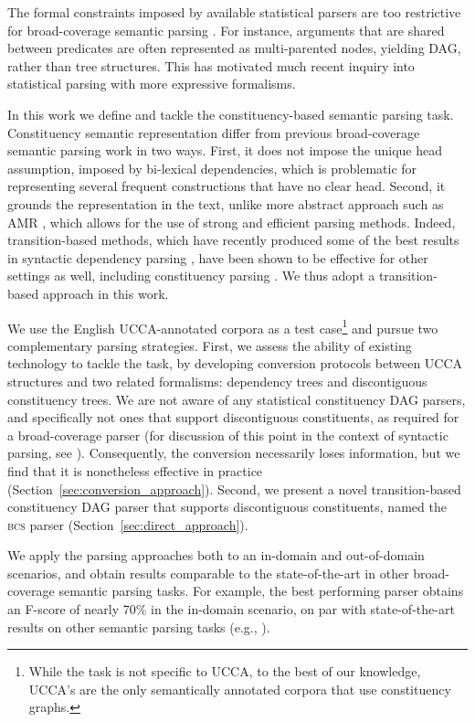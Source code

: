 \documentclass[11pt]{article}
\newcommand{\secref}[1]{Section~\ref{#1}}
\begin{document}
The formal constraints imposed by available statistical parsers are
too restrictive for broad-coverage semantic parsing \cite{oepen2015semeval}.
For instance, arguments that are
shared between predicates are often represented as multi-parented nodes,
yielding DAG, rather than tree structures. This has motivated much recent
inquiry into statistical parsing with more expressive formalisms.

In this work we define and tackle the constituency-based semantic parsing task.
Constituency semantic representation differ from previous broad-coverage semantic parsing
work in two ways.
First, it does not impose the unique head assumption, imposed
by bi-lexical dependencies, which is problematic for representing several
frequent constructions that have no clear head.
Second, it grounds the representation in the text,
unlike more abstract approach such as AMR \cite{banarescu2013abstract},
which allows for the use of strong and efficient parsing methods.
Indeed, transition-based methods, which have recently produced some of the best
results in syntactic dependency
parsing \cite{dyer2015transition,ballesteros2015improved},
have been shown to be effective for other settings as well,
including constituency parsing \cite{sagae2005classifier,zhu2013fast,maier2015discontinuous}. 
We thus adopt a transition-based approach in this work.

We use the English UCCA-annotated corpora \cite{abend2013universal} as a test
case\footnote{While the task is not specific to UCCA,
  to the best of our knowledge, UCCA's are the only
  semantically annotated corpora that use constituency graphs.}
and pursue two complementary parsing strategies.
First, we assess the ability of existing technology to tackle the task,
by developing conversion protocols between UCCA structures and two related formalisms:
dependency trees and discontiguous constituency trees.
We are not aware of any statistical constituency DAG parsers, and specifically not
ones that support discontiguous constituents, as required for a broad-coverage
parser (for discussion of this point in the context of syntactic parsing, see
\cite{kallmeyer2013data,pitler2015linear}).
Consequently, the conversion necessarily loses information, but 
we find that it is nonetheless effective
in practice (\secref{sec:conversion_approach}).
Second, we present a novel transition-based
constituency DAG parser that supports discontiguous constituents, named
the \textsc{bcs} parser (\secref{sec:direct_approach}).

We apply the parsing approaches both to an in-domain and out-of-domain scenarios,
and obtain results comparable to the state-of-the-art in other broad-coverage semantic parsing
tasks. For example, the best performing parser obtains an F-score of nearly 70\% in
the in-domain scenario, on par with state-of-the-art results on other semantic
parsing tasks (e.g., \cite{artzi2015broad}). 
\end{document}
